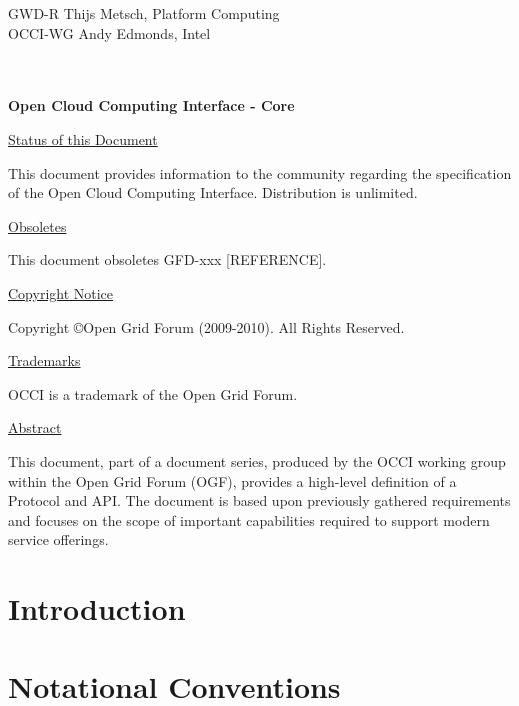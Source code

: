 \documentclass[10pt,a4paper,british]{article}
\begin{document}
\thispagestyle{empty}

GWD-R \hfill  Thijs Metsch, Platform Computing\\
OCCI-WG \hfill  Andy Edmonds, Intel\\
\\
\\

\vspace*{0.5in}

\begin{Large}
\textbf{Open Cloud Computing Interface - Core}
\end{Large}

\vspace*{0.5in}

\underline{Status of this Document}

This document provides information to the community regarding the
specification of the Open Cloud Computing Interface. Distribution is
unlimited.

\underline{Obsoletes}

This document obsoletes GFD-xxx [REFERENCE].

\underline{Copyright Notice}

Copyright \copyright Open Grid Forum (2009-2010). All Rights Reserved.

\underline{Trademarks}

OCCI is a trademark of the Open Grid Forum.

\underline{Abstract}

This document, part of a document series, produced by the OCCI working
group within the Open Grid Forum (OGF), provides a high-level
definition of a Protocol and API. The document is based upon
previously gathered requirements and focuses on the scope of important
capabilities required to support modern service offerings.

\newpage
\tableofcontents
\newpage

\section{Introduction}


\section{Notational Conventions}

\end{document}
